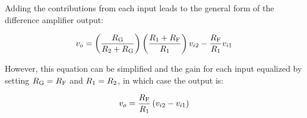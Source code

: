 Adding the contributions from each input leads to the general form of the difference amplifier output:

\begin{equation}
	\vout = \left(\frac{\R[G]}{\R[2] + \R[G]}\right)\left(\frac{\R[1] + \R[F]}{\R[1]}\right)\vin[2] - \frac{\R[F]}{\R[1]}\vin[1]
	\label{eq:difference_amp_general}
\end{equation}

However, this equation can be simplified and the gain for each input equalized by setting \(\R[G] = \R[F]\) and \(\R[1] = \R[2]\), in which case the output is:

\begin{equation}
	\vout = \frac{\R[F]}{\R[1]}\left(\vin[2] - \vin[1]\right)
	\label{eq:difference_amp}
\end{equation}


